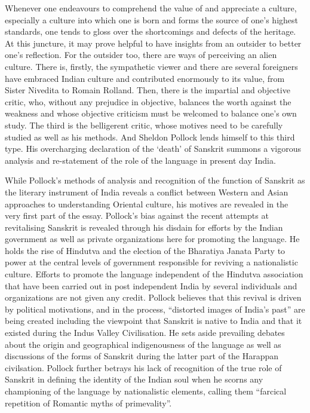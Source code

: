 Whenever one endeavours to comprehend the value of and appreciate a culture, especially a culture into which one is born and forms the source of one’s highest standards, one tends to gloss over the shortcomings and defects of the heritage. At this juncture, it may prove helpful to have insights from an outsider to better one’s reflection. For the outsider too, there are ways of perceiving an alien culture. There is, firstly, the sympathetic viewer and there are several foreigners have embraced Indian culture and contributed enormously to its value, from Sister Nivedita to Romain Rolland. Then, there is the impartial and objective critic, who, without any prejudice in objective, balances the worth against the weakness and whose objective criticism must be welcomed to balance one’s own study. The third is the belligerent critic, whose motives need to be carefully studied as well as his methods. And Sheldon Pollock lends himself to this third type. His overcharging declaration of the ‘death’ of Sanskrit summons a vigorous analysis and re-statement of the role of the language in present day India.

While Pollock’s methods of analysis and recognition of the function of Sanskrit as the literary instrument of India reveals a conflict between Western and Asian approaches to understanding Oriental culture, his motives are revealed in the very first part of the essay. Pollock’s bias against the recent attempts at revitalising Sanskrit is revealed through his disdain for efforts by the Indian government as well as private organizations here for promoting the language. He holds the rise of Hindutva and the election of the Bharatiya Janata Party to power at the central levels of government responsible for reviving a nationalistic culture. Efforts to promote the language independent of the Hindutva association that have been carried out in post independent India by several individuals and organizations are not given any credit. Pollock believes that this revival is driven by political motivations, and in the process, “distorted images of India’s past” are being created including the viewpoint that Sanskrit is native to India and that it existed during the Indus Valley Civilisation. He sets aside prevailing debates about the origin and geographical indigenousness of the language as well as discussions of the forms of Sanskrit during the latter part of the Harappan civilsation. Pollock further betrays his lack of recognition of the true role of Sanskrit in defining the identity of the Indian soul when he scorns any championing of the language by nationalistic elements, calling them “farcical repetition of Romantic myths of primevality”. 

